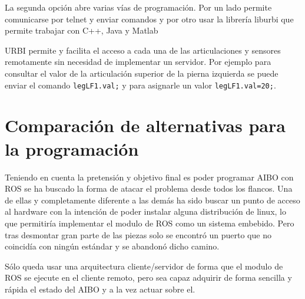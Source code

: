 \documentclass[12pt,a4paper,final,twoside]{book}
\begin{document}
La segunda opción abre varias vías de programación. Por un lado permite comunicarse por telnet y enviar comandos y por otro usar la librería liburbi que permite trabajar con C++, Java y Matlab

URBI permite y facilita el acceso a cada una de las articulaciones y sensores remotamente sin necesidad de implementar un servidor. Por ejemplo para consultar el valor de la articulación superior de la pierna izquierda se puede enviar el comando \texttt{legLF1.val;} y para asignarle un valor \texttt{legLF1.val=20;}\cite{urbicmd}.

\clearpage



\chapter{Comparación de alternativas para la programación}\label{seccomp}
\thispagestyle{fancy}
Teniendo en cuenta la pretensión y objetivo final es poder programar AIBO con ROS se ha buscado la forma de atacar el problema desde todos los flancos. 
Una de ellas y completamente diferente a las demás ha sido buscar un punto de acceso al hardware con la intención de poder instalar alguna distribución de linux, lo que permitiría implementar el modulo de ROS como un sistema embebido. Pero tras desmontar gran parte de las piezas solo se encontró un puerto que no coincidía con ningún estándar y se abandonó dicho camino.  

Sólo queda usar una arquitectura cliente/servidor de forma que el modulo de ROS se ejecute en el cliente remoto, pero sea capaz adquirir de forma sencilla y rápida el estado del AIBO y a la vez actuar sobre el.
\end{document}

